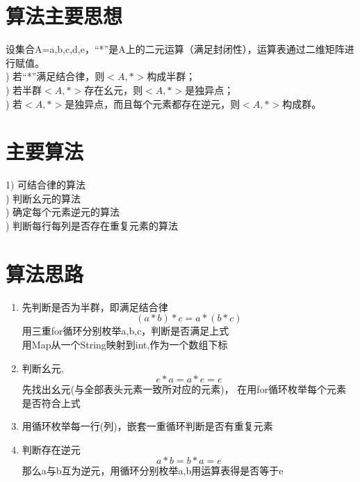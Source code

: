 \documentclass{article}
\begin{document}
\section{算法主要思想}
设集合A={a,b,c,d,e}，“*”是A上的二元运算（满足封闭性），运算表通过二维矩阵进行赋值。\\
) 若“*”满足结合律，则$<A,*>$构成半群；\\
) 若半群$<A,*>$存在幺元，则$<A,*>$是独异点；\\
) 若$<A,*>$是独异点，而且每个元素都存在逆元，则$<A,*>$构成群。\\

\section{主要算法}
1) 可结合律的算法\\
) 判断幺元的算法\\
) 确定每个元素逆元的算法\\
) 判断每行每列是否存在重复元素的算法\\
\section{算法思路}
\begin{enumerate}
    \item 先判断是否为半群，即满足结合律$$(a*b)*c=a*(b*c)$$
    用三重for循环分别枚举a,b,c，判断是否满足上式\\
    用Map从一个String映射到int,作为一个数组下标
    \item 判断幺元,$$e*a=a*e=e$$先找出幺元(与全部表头元素一致所对应的元素)，
    在用for循环枚举每个元素是否符合上式
    \item 用循环枚举每一行(列)，嵌套一重循环判断是否有重复元素
    \item 判断存在逆元$$a*b=b*a=e$$那么a与b互为逆元，用循环分别枚举a,b用运算表得是否等于e
    
\end{enumerate}
\end{document}
